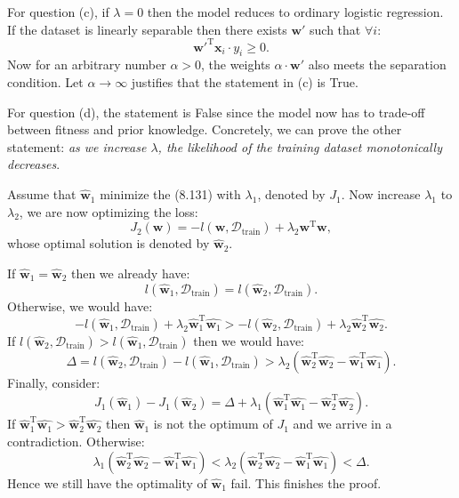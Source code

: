 \documentclass[UTF8]{ctexart}
\begin{document}
For question (c), if $\lambda=0$ then the model reduces to ordinary logistic regression.
If the dataset is linearly separable then there exists $\textbf{w}'$ such that $\forall i$:
$$\textbf{w}'^{\text{T}}\textbf{x}_{i}\cdot y_{i}\geq 0.$$
Now for an arbitrary number $\alpha>0$, the weights $\alpha\cdot\textbf{w}'$ also meets the separation condition.
Let $\alpha\rightarrow\infty$ justifies that the statement in (c) is True.

For question (d), the statement is False since the model now has to trade-off between fitness and prior knowledge.
Concretely, we can prove the other statement: \emph{as we increase $\lambda$, the likelihood of the training dataset monotonically decreases}.

Assume that $\hat{\textbf{w}}_{1}$ minimize the (8.131) with $\lambda_{1}$, denoted by $J_{1}$.
Now increase $\lambda_{1}$ to $\lambda_{2}$, we are now optimizing the loss:
$$J_{2}(\textbf{w})=-l(\textbf{w},\mathcal{D}_{\text{train}})+\lambda_{2}\textbf{w}^{\text{T}}\textbf{w},$$
whose optimal solution is denoted by $\hat{\textbf{w}}_{2}$.

If $\hat{\textbf{w}}_{1}=\hat{\textbf{w}}_{2}$ then we already have:
$$l(\hat{\textbf{w}}_{1},\mathcal{D}_{\text{train}})=l(\hat{\textbf{w}}_{2},\mathcal{D}_{\text{train}}).$$
Otherwise, we would have:
$$-l(\hat{\textbf{w}}_{1},\mathcal{D}_{\text{train}})+\lambda_{2}\hat{\textbf{w}}_{1}^{\text{T}}\hat{\textbf{w}_{1}} > -l(\hat{\textbf{w}}_{2},\mathcal{D}_{\text{train}})+\lambda_{2}\hat{\textbf{w}}_{2}^{\text{T}}\hat{\textbf{w}_{2}}.$$
If $l(\hat{\textbf{w}}_{2},\mathcal{D}_{\text{train}}) > l(\hat{\textbf{w}}_{1},\mathcal{D}_{\text{train}})$ then we would have:
$$\Delta=l(\hat{\textbf{w}}_{2},\mathcal{D}_{\text{train}})-l(\hat{\textbf{w}}_{1},\mathcal{D}_{\text{train}})>\lambda_{2}(\hat{\textbf{w}}_{2}^{\text{T}}\hat{\textbf{w}_{2}}-\hat{\textbf{w}}_{1}^{\text{T}}\hat{\textbf{w}_{1}}).$$
Finally, consider:
$$J_{1}(\hat{\textbf{w}}_{1})-J_{1}(\hat{\textbf{w}}_{2})=\Delta+\lambda_{1}(\hat{\textbf{w}}_{1}^{\text{T}}\hat{\textbf{w}_{1}}-\hat{\textbf{w}}_{2}^{\text{T}}\hat{\textbf{w}_{2}}).$$
If $\hat{\textbf{w}}_{1}^{\text{T}}\hat{\textbf{w}_{1}}>\hat{\textbf{w}}_{2}^{\text{T}}\hat{\textbf{w}_{2}}$ then $\hat{\textbf{w}}_{1}$ is not the optimum of $J_{1}$ and we arrive in a contradiction.
Otherwise:
$$\lambda_{1}(\hat{\textbf{w}}_{2}^{\text{T}}\hat{\textbf{w}_{2}}-\hat{\textbf{w}}_{1}^{\text{T}}\hat{\textbf{w}_{1}})<\lambda_{2}(\hat{\textbf{w}}_{2}^{\text{T}}\hat{\textbf{w}_{2}}-\hat{\textbf{w}}_{1}^{\text{T}}\hat{\textbf{w}_{1}})<\Delta.$$
Hence we still have the optimality of $\hat{\textbf{w}}_{1}$ fail.
This finishes the proof.
\end{document}

